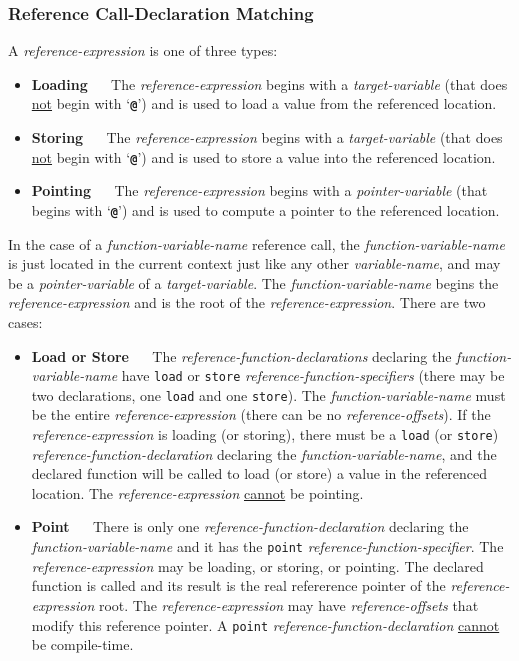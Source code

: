 \documentclass[12pt]{article}
\newcommand{\TT}[1]{{\tt \bfseries #1}}
\newcommand{\key}[1]{{\rm \bfseries #1}}
\begin{document}
\subsubsection{Reference Call-Declaration Matching}
\label{REFERENCE-CALL-DECLARATION-MATCHING}

A {\em reference-expression} is one of three types:
\begin{itemize}
\item \key{Loading} ~~ The {\em reference-expression} begins with a
{\em target-variable} (that does \underline{not} begin with `\TT{@}')
and is used to load a value from the referenced location.
\item \key{Storing} ~~ The {\em reference-expression} begins with a
{\em target-variable} (that does \underline{not} begin with `\TT{@}')
and is used to store a value into the referenced location.
\item \key{Pointing} ~~ The {\em reference-expression} begins with a
{\em pointer-variable} (that begins with `\TT{@}')
and is used to compute a pointer to the referenced location.
\end{itemize}

In the case of a {\em function-variable-name} reference call,
the {\em function-variable-name} is just located in the current
context just like any other {\em variable-name}, and may be
a {\em pointer-variable} of a {\em target-variable}.
The {\em function-variable-name} begins the {\em reference-expression}
and is the root of the {\em reference-expression}.
There are two cases:
\begin{itemize}
\item {\bf Load or Store} ~~
The {\em reference-function-declarations}
declaring the {\em function-variable-name} have {\tt load}
or {\tt store} {\em reference-function-specifiers} (there may be
two declarations, one {\tt load} and one {\tt store}).
The {\em function-variable-name} must be
the entire {\em reference-expression}
(there can be no {\em reference-offsets}).
If the {\em reference-expression} is loading (or storing), there
must be a {\tt load} (or {\tt store}) {\em reference-function-declaration}
declaring the {\em function-variable-name}, and the declared function will
be called to load (or store) a value in the referenced location.
The {\em reference-expression} \underline{cannot} be pointing.
\item {\bf Point} ~~
There is only one {\em reference-function-declaration}
declaring the {\em function-vari\-able-name} and it has the {\tt point}
{\em reference-function-specifier}.
The {\em reference-expression} may be loading, or storing, or pointing.
The declared function is called and its result is the real refererence pointer
of the {\em reference-expression} root.  The {\em reference-expression}
may have {\em reference-offsets} that modify this reference pointer.
A {\tt point} {\em reference-function-declaration} \underline{cannot}
be compile-time.
\end{itemize}
\end{document}
